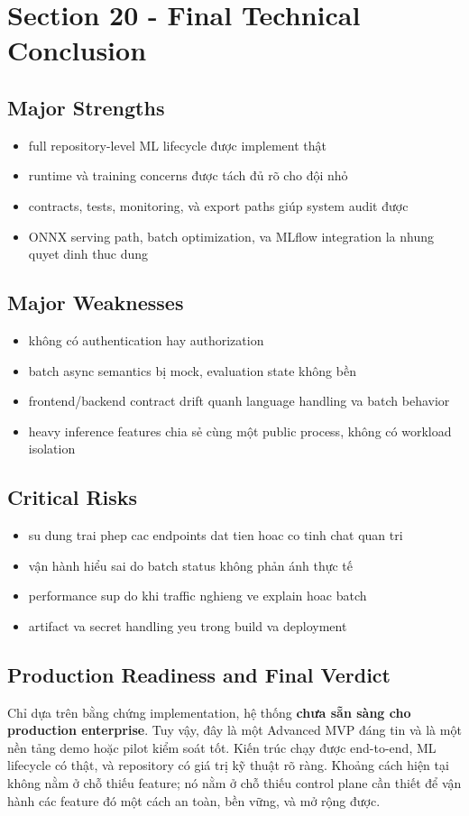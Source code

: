 \section{Section 20 - Final Technical Conclusion}
\subsection{Major Strengths}
\begin{itemize}[leftmargin=1.2em]
  \item full repository-level ML lifecycle được implement thật
  \item runtime và training concerns được tách đủ rõ cho đội nhỏ
  \item contracts, tests, monitoring, và export paths giúp system audit được
  \item ONNX serving path, batch optimization, va MLflow integration la nhung quyet dinh thuc dung
\end{itemize}

\subsection{Major Weaknesses}
\begin{itemize}[leftmargin=1.2em]
  \item không có authentication hay authorization
  \item batch async semantics bị mock, evaluation state không bền
  \item frontend/backend contract drift quanh language handling va batch behavior
  \item heavy inference features chia sẻ cùng một public process, không có workload isolation
\end{itemize}

\subsection{Critical Risks}
\begin{itemize}[leftmargin=1.2em]
  \item su dung trai phep cac endpoints dat tien hoac co tinh chat quan tri
  \item vận hành hiểu sai do batch status không phản ánh thực tế
  \item performance sup do khi traffic nghieng ve explain hoac batch
  \item artifact va secret handling yeu trong build va deployment
\end{itemize}

\subsection{Production Readiness and Final Verdict}
Chỉ dựa trên bằng chứng implementation, hệ thống \textbf{chưa sẵn sàng cho production enterprise}. Tuy vậy, đây là một Advanced MVP đáng tin và là một nền tảng demo hoặc pilot kiểm soát tốt. Kiến trúc chạy được end-to-end, ML lifecycle có thật, và repository có giá trị kỹ thuật rõ ràng. Khoảng cách hiện tại không nằm ở chỗ thiếu feature; nó nằm ở chỗ thiếu control plane cần thiết để vận hành các feature đó một cách an toàn, bền vững, và mở rộng được.


